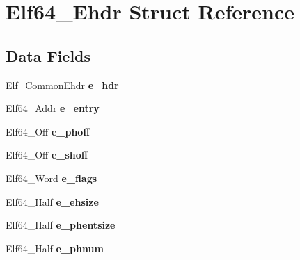 \hypertarget{structElf64__Ehdr}{}\section{Elf64\+\_\+\+Ehdr Struct Reference}
\label{structElf64__Ehdr}
\subsection*{Data Fields}
\begin{DoxyCompactItemize}
\item 
\hyperlink{structElf__CommonEhdr}{Elf\+\_\+\+Common\+Ehdr} {\bfseries e\+\_\+hdr}\hypertarget{structElf64__Ehdr_a20f593d961d1799b0ed4a8f60d2ef990}{}\label{structElf64__Ehdr_a20f593d961d1799b0ed4a8f60d2ef990}

\item 
Elf64\+\_\+\+Addr {\bfseries e\+\_\+entry}\hypertarget{structElf64__Ehdr_a943c7d038a3cc3c1115e84b4cd19966d}{}\label{structElf64__Ehdr_a943c7d038a3cc3c1115e84b4cd19966d}

\item 
Elf64\+\_\+\+Off {\bfseries e\+\_\+phoff}\hypertarget{structElf64__Ehdr_adc7d13d5c0e0eb4b62f0f898f03b2e66}{}\label{structElf64__Ehdr_adc7d13d5c0e0eb4b62f0f898f03b2e66}

\item 
Elf64\+\_\+\+Off {\bfseries e\+\_\+shoff}\hypertarget{structElf64__Ehdr_a63fca3f9b273e5fd4d190d9cb7fba9b0}{}\label{structElf64__Ehdr_a63fca3f9b273e5fd4d190d9cb7fba9b0}

\item 
Elf64\+\_\+\+Word {\bfseries e\+\_\+flags}\hypertarget{structElf64__Ehdr_ae6ea9e821472d35e7d2c446fa79bdc3a}{}\label{structElf64__Ehdr_ae6ea9e821472d35e7d2c446fa79bdc3a}

\item 
Elf64\+\_\+\+Half {\bfseries e\+\_\+ehsize}\hypertarget{structElf64__Ehdr_a404b7e3566d912b0382cacea17475e92}{}\label{structElf64__Ehdr_a404b7e3566d912b0382cacea17475e92}

\item 
Elf64\+\_\+\+Half {\bfseries e\+\_\+phentsize}\hypertarget{structElf64__Ehdr_ab5aefb7a14b9cf2eafcbaf0664852369}{}\label{structElf64__Ehdr_ab5aefb7a14b9cf2eafcbaf0664852369}

\item 
Elf64\+\_\+\+Half {\bfseries e\+\_\+phnum}\hypertarget{structElf64__Ehdr_af13bac5685d725c2ba9930c1176f3082}{}\label{structElf64__Ehdr_af13bac5685d725c2ba9930c1176f3082}


\end{DoxyCompactItemize}
